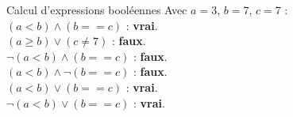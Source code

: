 \begin{UPSTIprofOnlyEnv}
  \begin{UPSTIcorrectionP}{Calcul d'expressions booléennes}
    Avec $a=3$, $b=7$, $c=7$ :  \\
    $(a<b)\land(b==c)$ : \textbf{vrai}.  \\
    $(a\ge b)\lor(c\neq7)$ : \textbf{faux}.  \\
    $\neg(a<b)\land(b==c)$ : \textbf{faux}.  \\
    $(a<b)\land\neg(b==c)$ : \textbf{faux}.  \\
    $(a<b)\lor(b==c)$ : \textbf{vrai}.  \\
    $\neg(a<b)\lor(b==c)$ : \textbf{vrai}.
  \end{UPSTIcorrectionP}
\end{UPSTIprofOnlyEnv}
